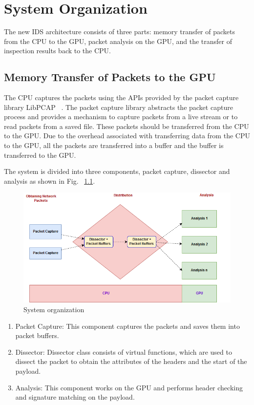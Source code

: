 \chapter{System Organization}
The new IDS architecture consists of three parts: memory transfer of packets from the CPU to the GPU, packet analysis on the GPU, and the transfer of inspection results back to the CPU.

\section{Memory Transfer of Packets to the GPU}
The CPU captures the packets using the APIs provided by the packet capture library LibPCAP ~\cite{bib4}. The packet capture library abstracts the packet capture process and provides a mechanism to capture packets from a live stream or to read packets from a saved file. These packets should be transferred from the CPU to the GPU. Due to the overhead associated with transferring data from the CPU to the GPU, all the packets are transferred into a buffer and the buffer is transferred to the GPU.

The system is divided into three components, packet capture, dissector and analysis as shown in Fig. ~\ref{fig:systemorganization}.

\begin{figure}[H]
	\centering
	\includegraphics[width=14cm]{systemorganization.png}
	\caption[System organization]{System organization}
	\label{fig:systemorganization}
\end{figure}
\squeezeup

\begin{enumerate}[leftmargin=*]
	\item Packet Capture: This component captures the packets and saves them into packet buffers.
	\item Dissector: Dissector class consists of virtual functions, which are used to dissect the packet to obtain the attributes of the headers and the start of the payload.
	\item Analysis: This component works on the GPU and performs header checking and signature matching on the payload.
\end{enumerate}
\vspace{\topsep}

